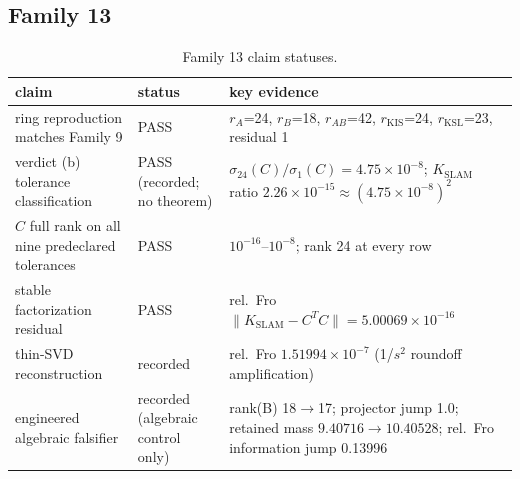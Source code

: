 \documentclass[12pt]{article}
\begin{document}
\subsection{Family 13}
\begin{table}[ht]
\centering
\small
\caption{Family 13 claim statuses.}
\label{app:tab:f13}
\begin{tabular}{p{} p{} p{}}
\toprule
claim & status & key evidence \\
\midrule
ring reproduction matches Family 9 & PASS &
$r_A$=24, $r_B$=18, $r_{AB}$=42, $r_{\mathrm{KIS}}$=24, $r_{\mathrm{KSL}}$=23,
residual 1 \\
verdict (b) tolerance classification & PASS (recorded; no theorem) &
$\sigma_{24}(C)/\sigma_1(C)=4.75\times10^{-8}$;
$K_{\mathrm{SLAM}}$ ratio $2.26\times10^{-15}\approx(4.75\times10^{-8})^2$ \\
$C$ full rank on all nine predeclared tolerances & PASS &
$10^{-16}$--$10^{-8}$; rank 24 at every row \\
stable factorization residual & PASS &
rel.\ Fro $\|K_{\mathrm{SLAM}}-C^TC\|=5.00069\times10^{-16}$ \\
thin-SVD reconstruction & recorded &
rel.\ Fro $1.51994\times10^{-7}$ (1/$s^2$ roundoff amplification) \\
engineered algebraic falsifier & recorded (algebraic control only) &
rank(B) 18$\to$17; projector jump 1.0; retained mass
$9.40716\to10.40528$; rel.\ Fro information jump 0.13996 \\
\bottomrule
\end{tabular}
\end{table}
\end{document}
